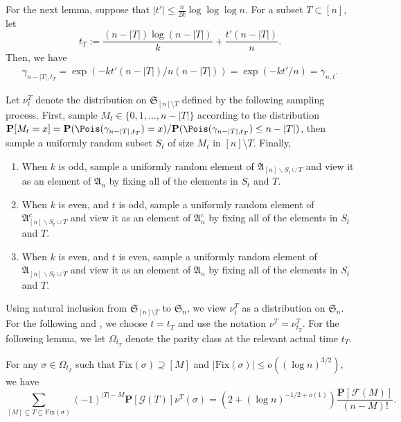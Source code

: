 For the next lemma, suppose that $|t'| \leq \frac{n}{2k}\log \log \log n$. For a subset $T \subset [n]$, let 
\[
t_T := \frac{(n-|T|)\log(n-|T|)}{k}+ \frac{t'(n-|T|)}{n}.
\]
Then, we have 
\begin{equation}\label{eq: gamma_T}
\begin{aligned}
    \gamma_{n-|T|,t_T} = \exp(-kt'(n-|T|)/n(n-|T|)) = \exp(-kt'/n) =\gamma_{n,t}.
\end{aligned}
\end{equation}
\begin{defi}\label{def: nu^T_t}
    Let $\nu^T_t$ denote the distribution on $\mathfrak{S}_{[n]\setminus T}$  defined by the following sampling process. First, sample $M_t\in\{0,1,\ldots,n-|T|\}$ according to the distribution $\mathbf{P}[M_t=x]=\mathbf{P}(\Pois(\gamma_{n-|T|,t_T})=x)/\mathbf{P}(\Pois(\gamma_{n-|T|,t_T})\le n-|T|)$, then sample a uniformly random subset $S_t$ of size $M_t$ in $[n]\setminus T$. Finally,
\begin{enumerate}
\item When $k$ is odd, sample a uniformly random element of $\mathfrak{A}_{[n]\backslash S_t \cup T}$ and view it as an element of $\mathfrak{A}_n$ by fixing all of the elements in $S_t$ and $T$.
\item When $k$ is even, and $t$ is odd, sample a uniformly random element of $\mathfrak{A}_{[n]\backslash S_t\cup T}^c$ and view it as an element of $\mathfrak{A}_n^c$ by fixing all of the elements in $S_t$ and $T$.
\item When $k$ is even, and $t$ is even, sample a uniformly random element of $\mathfrak{A}_{[n]\backslash S_t\cup T}$ and view it as an element of $\mathfrak{A}_n$ by fixing all of the elements in $S_t$ and $T$.
\end{enumerate}
\end{defi}
Using natural inclusion from $\mathfrak{S}_{[n]\setminus T}$ to $\mathfrak{S}_n$, we view $\nu_t^T$ as a distribution on $\mathfrak{S}_n$. For the following  and , we choose $ t = t_T$ and use the notation $\nu^T = \nu_{t_T}^T$. For the following lemma, we let $\Omega_{t_T}$ denote the parity class at the relevant actual time $t_T.$
\begin{lemma}\label{lem: relation of T and M}
    For any $\sigma \in \Omega_{t_T}$ such that $\mathrm{Fix}(\sigma) \supseteq [M]$ and $|\mathrm{Fix}(\sigma)| \leq {o((\log n)^{3/2})}$, we have
    \[
    \sum_{[M] \subseteq T \subseteq \mathrm{Fix}(\sigma)}(-1)^{|T| - M}\mathbf{P}[\mathcal{G}(T)]\nu^T(\sigma) = (2+(\log n)^{-1/2+o(1)})\frac{\mathbf{P}[\mathcal{F}(M)]}{(n-M)!}.
    \]
\end{lemma}

